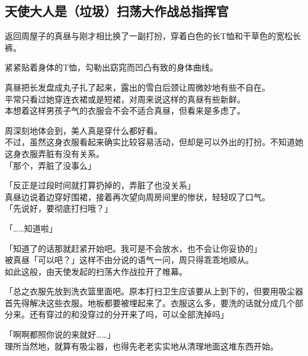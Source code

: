 \subsection{天使大人是（垃圾）扫荡大作战总指挥官}

返回周屋子的真昼与刚才相比换了一副打扮，穿着白色的长T恤和干草色的宽松长裤。

紧紧贴着身体的T恤，勾勒出窈窕而凹凸有致的身体曲线。

真昼把长发盘成丸子扎了起来，露出的雪白后颈让周微妙地有些不自在。\\

平常只看过她穿连衣裙或是短裙，对周来说这样的真昼有些新鲜。\\

本想着这样男孩子气的衣服会不会不适合真昼，但看来是多虑了。

周深刻地体会到，美人真是穿什么都好看。\\

不过，虽然这身衣服看起来确实比较容易活动，但却是可以外出的打扮。不知道她这身衣服弄脏有没有关系。\\

「那个，弄脏了没事么」

「反正是过段时间就打算扔掉的，弄脏了也没关系」\\

真昼边说着边穿好围裙，接着再次望向周房间里的惨状，轻轻叹了口气。\\

「先说好，要彻底打扫哦？」

「……知道啦」

「知道了的话那就赶紧开始吧。我可是不会放水，也不会让你妥协的」\\

被真昼「可以吧？」这样不由分说的语气一问，周只得乖乖地顺从。\\

如此这般，由天使发起的扫荡大作战拉开了帷幕。\\

\vspace{2\baselineskip}

「总之衣服先放到洗衣篮里面吧。原本打扫卫生应该要从上到下的，但要用吸尘器首先得解决这些衣服。地板都要被埋起来了。衣服这么多，要洗的话就分成几个部分来。还有穿过的和没穿过的分开来了吗，可以全部洗掉吗」

「啊啊都照你说的来就好……」\\

理所当然地，就算有吸尘器，也得先老老实实地从清理地面这堆东西开始。\\

